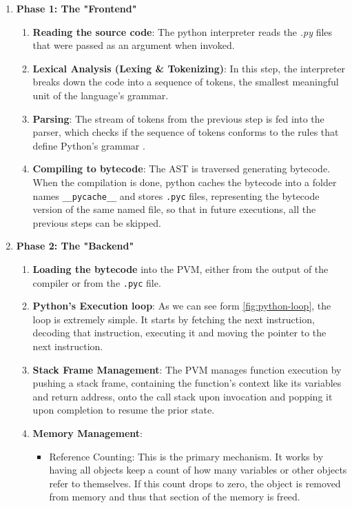 \begin{enumerate}
    \item \textbf{Phase 1: The "Frontend"} 
    \begin{enumerate}
        \item \textbf{Reading the source code}: The python interpreter reads the \textit{.py} files that were passed as an argument when invoked.
        \item \textbf{Lexical Analysis (Lexing \& Tokenizing)}: In this step, the interpreter breaks down the code into a sequence of tokens, the smallest meaningful unit of the language's grammar.
        \item \textbf{Parsing}: The stream of tokens from the previous step is fed into the parser, which checks if the sequence of tokens conforms to the rules that define Python's grammar \cite{python_grammar_ref}.
        \item \textbf{Compiling to \gls{bytecode}}: The \gls{AST} is traversed generating \gls{bytecode}. When the compilation is done, python caches the bytecode into a folder names \texttt{\_\_pycache\_\_} and stores \texttt{.pyc} files, representing the \gls{bytecode} version of the same named file, so that in future executions, all the previous steps can be skipped.
    \end{enumerate}
    \item \textbf{Phase 2: The "Backend"} 
    \begin{enumerate}
        \item \textbf{Loading the \gls{bytecode}} into the \gls{PVM}, either from the output of the compiler or from the \texttt{.pyc} file.
        \item \textbf{Python's Execution loop}: As we can see form \autoref{fig:python-loop}, the loop is extremely simple. It starts by fetching the next instruction, decoding that instruction, executing it and moving the pointer to the next instruction.
        \item \textbf{Stack Frame Management}: The \gls{PVM} manages function execution by pushing a stack frame, containing the function's context like its variables and return address, onto the call stack upon invocation and popping it upon completion to resume the prior state.
        \item \textbf{Memory Management}:
        \begin{itemize}
            \item Reference Counting: This is the primary mechanism. It works by having all objects keep a count of how many variables or other objects refer to themselves. If this count drops to zero, the object is removed from memory and thus that section of the memory is freed.

\end{itemize}
\end{enumerate}
\end{enumerate}
